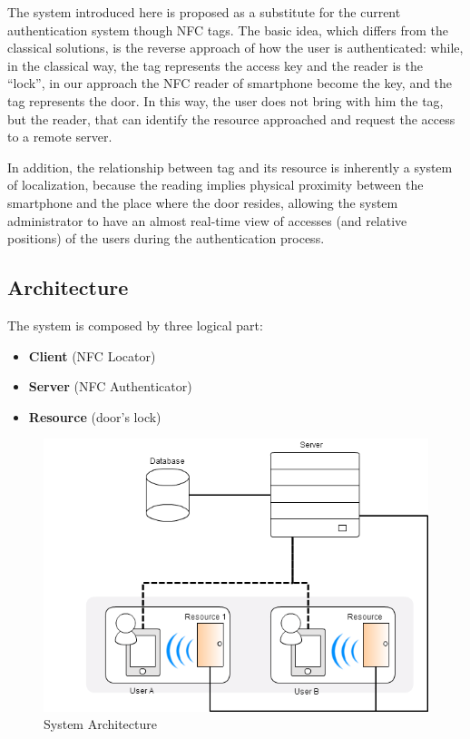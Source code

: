 \documentclass[conference]{IEEEtran}
\begin{document}
The system introduced here is proposed as a substitute for the current authentication system though NFC tags. The basic idea, which differs from the classical solutions, is the reverse approach of how the user is authenticated: while, in the classical way, the tag represents the access key and the reader is the ``lock'', in our approach the NFC reader of smartphone become the key, and the tag represents the door. In this way, the user does not bring with him the tag, but the reader, that can identify the resource approached and request the access to a remote server.

In addition, the relationship between tag and its resource is inherently a system of localization, because the reading implies physical proximity between the smartphone and the place where the door resides, allowing the system administrator to have an almost real-time view of accesses (and relative positions) of the users during the authentication process.

\subsection{Architecture}
The system is composed by three logical part:
\begin{itemize}
 \item \textbf{Client} (NFC Locator)
 \item \textbf{Server} (NFC Authenticator)
 \item \textbf{Resource} (door’s lock)
\end{itemize}

\begin{figure}[h]
\centering
\includegraphics[scale=0.4]{fig1}
\caption{System Architecture}
\label{fig_sim}
\end{figure}
\end{document}
